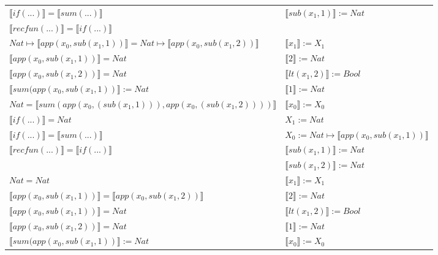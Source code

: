 \begin{exercise}
\begin{description}
\begin{center}
\begin{longtable}[!h]{ | l | l | }
                        $ \llbracket if(...) \rrbracket =  \llbracket sum(...) \rrbracket$ & $ \llbracket sub(x_1,1) \rrbracket := Nat$\\
                        $ \llbracket recfun(...) \rrbracket =  \llbracket if(...) \rrbracket$ & \\
                    \hline
                        $Nat \mapsto  \llbracket app(x_0, sub(x_1,1)) \rrbracket = Nat \mapsto  \llbracket app(x_0, sub(x_1,2)) \rrbracket$ & $ \llbracket x_1 \rrbracket := X_1$\\
                        $ \llbracket app(x_0, sub(x_1,1)) \rrbracket = Nat$ & $ \llbracket 2 \rrbracket := Nat$\\
                        $ \llbracket app(x_0, sub(x_1,2)) \rrbracket = Nat$ & $ \llbracket lt(x_1 , 2) \rrbracket := Bool$\\
                        $ \llbracket sum(app(x_0, sub(x_1,1)) \rrbracket := Nat$ &  $ \llbracket 1 \rrbracket := Nat$\\
                        $Nat =  \llbracket sum(app(x_0, (sub(x_1,1))), app(x_0, (sub(x_1,2)))) \rrbracket$ & $ \llbracket x_0 \rrbracket := X_0$\\
                        $ \llbracket if(...) \rrbracket = Nat$ & $X_1 := Nat$\\
                        $ \llbracket if(...) \rrbracket =  \llbracket sum(...) \rrbracket$ & $X_0 := Nat \mapsto  \llbracket app(x_0, sub(x_1,1)) \rrbracket$\\
                        $ \llbracket recfun(...) \rrbracket =  \llbracket if(...) \rrbracket$ & $ \llbracket sub(x_1,1) \rrbracket := Nat$\\
                        & $ \llbracket sub(x_1,2) \rrbracket := Nat$ \\
                    \hline
                        $Nat = Nat$ & $ \llbracket x_1 \rrbracket := X_1$\\
			     $ \llbracket app(x_0, sub(x_1,1)) \rrbracket =  \llbracket app(x_0, sub(x_1,2)) \rrbracket$ & $ \llbracket 2 \rrbracket := Nat$\\
                        $ \llbracket app(x_0, sub(x_1,1)) \rrbracket = Nat$ &  $ \llbracket lt(x_1 , 2) \rrbracket := Bool$\\
                        $ \llbracket app(x_0, sub(x_1,2)) \rrbracket = Nat$ &  $ \llbracket 1 \rrbracket := Nat$\\
                        $ \llbracket sum(app(x_0, sub(x_1,1)) \rrbracket := Nat$ &  $ \llbracket x_0 \rrbracket := X_0$\\

\end{longtable}
\end{center}
\end{description}
\end{exercise}
